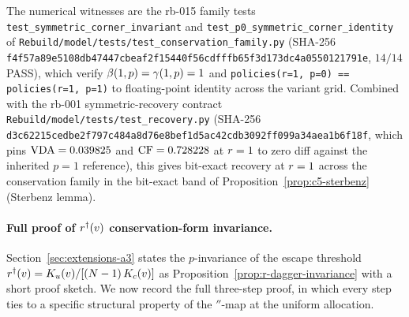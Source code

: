 The numerical witnesses are the rb-015 family tests
\texttt{test\_symmetric\_corner\_invariant} and
\texttt{test\_p0\_symmetric\_corner\_identity} of
\texttt{Rebuild/model/tests/test\_conservation\_family.py} (SHA-256
\texttt{f4f57a89e5108db47447cbeaf2f15440f56cdfffb65f3d173dc4a0550121791e},
$14/14$ PASS), which verify
$\beta(1, p) = \gamma(1, p) = 1$ and
\texttt{policies(r=1, p=0) == policies(r=1, p=1)} to floating-point
identity across the variant grid. Combined with the rb-001
symmetric-recovery contract
\texttt{Rebuild/model/tests/test\_recovery.py} (SHA-256
\texttt{d3c62215cedbe2f797c484a8d76e8bef1d5ac42cdb3092ff099a34aea1b6f18f},
which pins $\mathrm{VDA} = 0.039825$ and $\mathrm{CF} = 0.728228$ at $r = 1$
to zero diff against the inherited $p = 1$ reference), this gives
bit-exact recovery at $r = 1$ across the conservation family
in the bit-exact band of Proposition~\ref{prop:c5-sterbenz}
(Sterbenz lemma).

\paragraph{Full proof of $r^{\dagger}(v)$ conservation-form invariance.}
Section~\ref{sec:extensions-a3} states the $p$-invariance of the
escape threshold $r^{\dagger}(v) = K_u(v)/[(N - 1)\,
K_c(v)]$ as Proposition~\ref{prop:r-dagger-invariance} with a
short proof sketch. We now record the full three-step proof, in
which every step ties to a specific structural property of the
$\dprime$-map at the uniform allocation.


